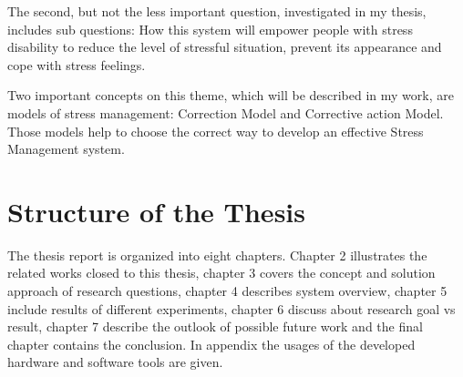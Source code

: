 The second, but not the less important question, investigated in my thesis, includes sub questions: How this system will empower people with stress disability to reduce the level of stressful situation, prevent its appearance and cope with stress feelings.

Two  important  concepts  on  this  theme,  which  will  be described in my work, are  models  of stress management: Correction Model and Corrective action Model. Those models help to choose the correct way to develop an effective Stress Management system.

\section{Structure of the Thesis}
The thesis report is organized into eight chapters. Chapter 2 illustrates the related works closed to this thesis, chapter 3 covers the concept and solution approach of research questions, chapter 4 describes system overview, chapter 5 include results of different experiments, chapter 6 discuss about research goal vs result, chapter 7 describe the outlook of possible future work and the final chapter contains the conclusion. In appendix the usages of the developed hardware and software tools are given.
